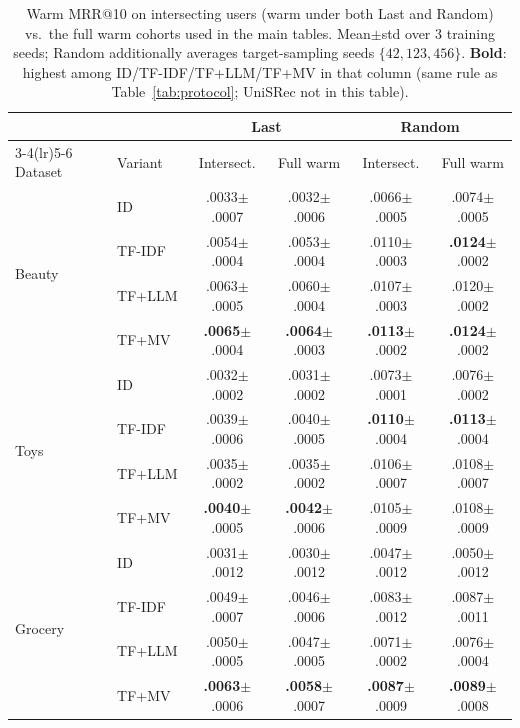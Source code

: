 \documentclass[sigconf,natbib=true,anonymous]{acmart}
\newcommand{\tfidf}{\textsc{TF-IDF}\xspace}
\newcommand{\tfllm}{\textsc{TF+LLM}\xspace}
\newcommand{\tfmv}{\textsc{TF+MV}\xspace}
\begin{document}
\begin{table}[H]
\centering
\caption{Warm MRR@10 on intersecting users (warm under both Last and Random) vs.\ the full warm cohorts used in the main tables. Mean$\pm$std over 3 training seeds; Random additionally averages target-sampling seeds $\{42,123,456\}$. \textbf{Bold}: highest among ID/\tfidf/\tfllm/\tfmv in that column (same rule as Table~\ref{tab:protocol}; UniSRec not in this table).}
\label{tab:intersection}
\small
\setlength{\tabcolsep}{3pt}
\begin{tabular}{@{}llcccc@{}}
\toprule
& & \multicolumn{2}{c}{Last} & \multicolumn{2}{c}{Random} \\
\cmidrule(lr){3-4}\cmidrule(lr){5-6}
Dataset & Variant & Intersect. & Full warm & Intersect. & Full warm \\
\midrule
\multirow{4}{*}{Beauty}
 & ID     & .0033$\pm$.0007 & .0032$\pm$.0006 & .0066$\pm$.0005 & .0074$\pm$.0005 \\
 & \tfidf & .0054$\pm$.0004 & .0053$\pm$.0004 & .0110$\pm$.0003 & \textbf{.0124}$\pm$.0002 \\
 & \tfllm & .0063$\pm$.0005 & .0060$\pm$.0004 & .0107$\pm$.0003 & .0120$\pm$.0002 \\
 & \tfmv  & \textbf{.0065}$\pm$.0004 & \textbf{.0064}$\pm$.0003 & \textbf{.0113}$\pm$.0002 & \textbf{.0124}$\pm$.0002 \\
\midrule
\multirow{4}{*}{Toys}
 & ID     & .0032$\pm$.0002 & .0031$\pm$.0002 & .0073$\pm$.0001 & .0076$\pm$.0002 \\
 & \tfidf & .0039$\pm$.0006 & .0040$\pm$.0005 & \textbf{.0110}$\pm$.0004 & \textbf{.0113}$\pm$.0004 \\
 & \tfllm & .0035$\pm$.0002 & .0035$\pm$.0002 & .0106$\pm$.0007 & .0108$\pm$.0007 \\
 & \tfmv  & \textbf{.0040}$\pm$.0005 & \textbf{.0042}$\pm$.0006 & .0105$\pm$.0009 & .0108$\pm$.0009 \\
\midrule
\multirow{4}{*}{Grocery}
 & ID     & .0031$\pm$.0012 & .0030$\pm$.0012 & .0047$\pm$.0012 & .0050$\pm$.0012 \\
 & \tfidf & .0049$\pm$.0007 & .0046$\pm$.0006 & .0083$\pm$.0012 & .0087$\pm$.0011 \\
 & \tfllm & .0050$\pm$.0005 & .0047$\pm$.0005 & .0071$\pm$.0002 & .0076$\pm$.0004 \\
 & \tfmv  & \textbf{.0063}$\pm$.0006 & \textbf{.0058}$\pm$.0007 & \textbf{.0087}$\pm$.0009 & \textbf{.0089}$\pm$.0008 \\
\bottomrule
\end{tabular}
\end{table}
\end{document}
